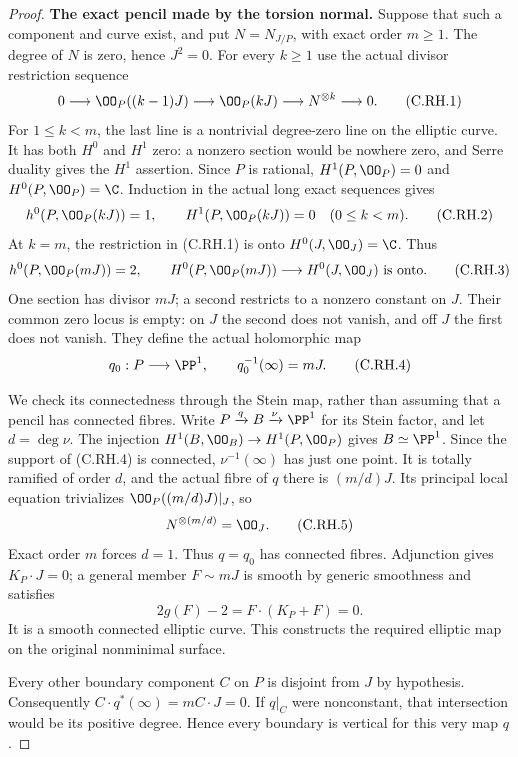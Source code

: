 \begin{proof}
\par\medskip\noindent\textbf{The exact pencil made by the torsion normal.}
Suppose that such a component and curve exist, and put
\(N=N_{J/P}\), with exact order \(m\ge1\).
The degree of \(N\) is zero, hence \(J^2=0\).
For every \(k\ge1\) use the actual divisor restriction
sequence
\[
 0\longrightarrow\OO_P((k-1)J)
 \longrightarrow\OO_P(kJ)
 \longrightarrow N^{\otimes k}\longrightarrow0.
 \tag{C.RH.1}
\]
For \(1\le k<m\), the last line is a nontrivial
degree-zero line on the elliptic curve. It has
both \(H^0\) and \(H^1\) zero: a nonzero section
would be nowhere zero, and Serre duality gives
the \(H^1\) assertion. Since \(P\) is rational,
\(H^1(P,\OO_P)=0\) and \(H^0(P,\OO_P)=\C\).
Induction in the actual long exact sequences gives
\[
 h^0(P,\OO_P(kJ))=1,\qquad
 H^1(P,\OO_P(kJ))=0\quad(0\le k<m).
 \tag{C.RH.2}
\]
At \(k=m\), the restriction in (C.RH.1) is
onto \(H^0(J,\OO_J)=\C\). Thus
\[
 h^0(P,\OO_P(mJ))=2,\qquad
 H^0(P,\OO_P(mJ))\longrightarrow H^0(J,\OO_J)
                         \text{ is onto}.
 \tag{C.RH.3}
\]
One section has divisor \(mJ\); a second restricts
to a nonzero constant on \(J\). Their common
zero locus is empty: on \(J\) the second
does not vanish, and off \(J\) the first
does not vanish. They define the actual
holomorphic map
\[
                   q_0:P\longrightarrow\PP^1,\qquad
                             q_0^{-1}(\infty)=mJ .
 \tag{C.RH.4}
\]

We check its connectedness through the Stein map,
rather than assuming that a pencil has connected
fibres. Write \(P\xrightarrow q B\xrightarrow\nu\PP^1\)
for its Stein factor, and let \(d=\deg\nu\).
The injection \(H^1(B,\OO_B)\to H^1(P,\OO_P)\)
gives \(B\simeq\PP^1\).
Since the support of (C.RH.4) is connected,
\(\nu^{-1}(\infty)\) has just one point.
It is totally ramified of order \(d\), and
the actual fibre of \(q\) there is
\((m/d)J\). Its principal local equation
trivializes \(\OO_P((m/d)J)|_J\), so
\[
                   N^{\otimes(m/d)}=\OO_J.
 \tag{C.RH.5}
\]
Exact order \(m\) forces \(d=1\).
Thus \(q=q_0\) has connected fibres.
Adjunction gives \(K_P\cdot J=0\);
a general member \(F\sim mJ\) is smooth
by generic smoothness and satisfies
\[
                 2g(F)-2=F\cdot(K_P+F)=0.
 \tag{C.RH.6}
\]
It is a smooth connected elliptic curve.
This constructs the required elliptic
map on the original nonminimal surface.

Every other boundary component \(C\) on
\(P\) is disjoint from \(J\) by hypothesis.
Consequently \(C\cdot q^*(\infty)=mC\cdot J=0\).
If \(q|_C\) were nonconstant, that intersection
would be its positive degree. Hence every
boundary is vertical for this very map \(q\).


\end{proof}
